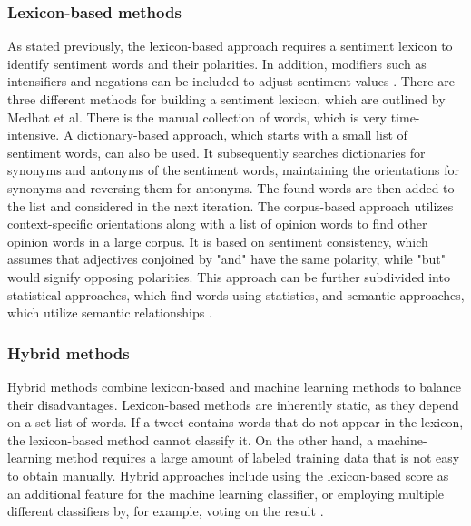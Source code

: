 \subsubsection{Lexicon-based methods}
\label{sub:fund_lex}
As stated previously, the lexicon-based approach requires a sentiment lexicon to identify sentiment words and their polarities. In addition, modifiers such as intensifiers and negations can be included to adjust sentiment values \cite{liu_2015}. There are three different methods for building a sentiment lexicon, which are outlined by Medhat et al. There is the manual collection of words, which is very time-intensive. A dictionary-based approach, which starts with a small list of sentiment words, can also be used. It subsequently searches dictionaries for synonyms and antonyms of the sentiment words, maintaining the orientations for synonyms and reversing them for antonyms. The found words are then added to the list and considered in the next iteration. The corpus-based approach utilizes context-specific orientations along with a list of opinion words to find other opinion words in a large corpus. It is based on sentiment consistency, which assumes that adjectives conjoined by "and" have the same polarity, while "but" would signify opposing polarities. This approach can be further subdivided into statistical approaches, which find words using statistics, and semantic approaches, which utilize semantic relationships \cite{MEDHAT20141093}.

\subsubsection{Hybrid methods}

Hybrid methods combine lexicon-based and machine learning methods to balance their disadvantages. Lexicon-based methods are inherently static, as they depend on a set list of words. If a tweet contains words that do not appear in the lexicon, the lexicon-based method cannot classify it. On the other hand, a machine-learning method requires a large amount of labeled training data that is not easy to obtain manually. Hybrid approaches include using the lexicon-based score as an additional feature for the machine learning classifier, or employing multiple different classifiers by, for example, voting on the result \cite{DBLP:journals/csur/GiachanouC16}.


